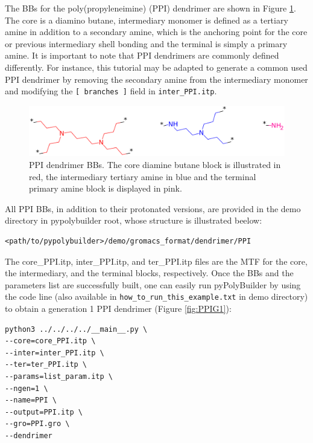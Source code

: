 
The BBs for the poly(propyleneimine) (PPI) dendrimer are shown in Figure \ref{fig:PPIBB}.
The core is a diamino butane, intermediary monomer is defined as a tertiary amine in addition to a secondary amine, which is the anchoring point for the core or previous intermediary shell bonding and the terminal is simply a primary amine.
It is important to note that PPI dendrimers are commonly defined differently.
For instance, this tutorial may be adapted to generate a common used PPI dendrimer by removing the secondary amine from the intermediary monomer and modifying the \texttt{[ branches ]} field in \texttt{inter\_PPI.itp}.

\begin{figure}
    \centering
    \includegraphics[width=\textwidth]{PPI/PPIBBs.png}
    \caption{PPI dendrimer BBs.
             The core diamine butane block is illustrated in red, the intermediary tertiary amine in blue and the terminal primary amine block is displayed in pink.}
    \label{fig:PPIBB}
\end{figure}

All PPI BBs, in addition to their protonated versions, are provided in the demo directory in pypolybuilder root, whose structure is illustrated beelow:
\begin{lstlisting}
<path/to/pypolybuilder>/demo/gromacs_format/dendrimer/PPI
\end{lstlisting}

The core\_PPI.itp, inter\_PPI.itp, and ter\_PPI.itp files are the MTF for the core, the intermediary, and the terminal blocks, respectively.
Once the BBs and the parameters list are successfully built, one can easily run pyPolyBuilder by using the code line (also available in \texttt{how\_to\_run\_this\_example.txt} in demo directory) to obtain a generation 1 PPI dendrimer (Figure \ref{fig:PPIG1}):

\begin{lstlisting}
python3 ../../../../__main__.py \
--core=core_PPI.itp \
--inter=inter_PPI.itp \
--ter=ter_PPI.itp \
--params=list_param.itp \
--ngen=1 \
--name=PPI \
--output=PPI.itp \
--gro=PPI.gro \
--dendrimer
\end{lstlisting}

